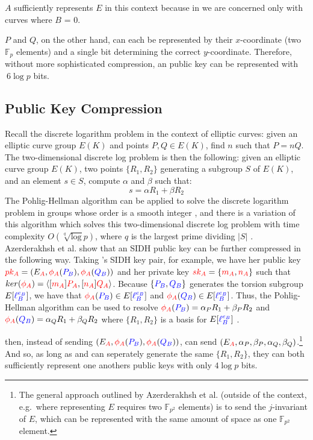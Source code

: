 $A$ sufficiently represents $E$ in this context because in \sidh we are concerned only with curves where $B$ = 0. 

$P$ and $Q$, on the other hand, can each be represented by their $x$-coordinate (two $\mathbb{F}_{p}$ elements) and a single bit determining the correct $y$-coordinate. Therefore, without more sophisticated compression, an \sidh public key can be represented with $~6\log p$ bits.

\subsection{Public Key Compression}

Recall the discrete logarithm problem in the context of elliptic curves: given an elliptic curve group $E(K)$ and points $P, Q \in E(K)$, find $n$ such that $P = nQ$. The two-dimensional discrete log problem is then the following: given an elliptic curve group $E(K)$, two points $\{R_1, R_2\}$ generating a subgroup $S$ of $E(K)$, and an element $s \in S$, compute $\alpha$ and $\beta$ such that:
$$
s = \alpha R_1 + \beta R_2
$$
The Pohlig-Hellman algorithm can be applied to solve the discrete logarithm problem in groups whose order is a smooth integer \cite{ph}, and there is a variation of this algorithm which solves this two-dimensional discrete log problem with time complexity $O(\sqrt[q]\log p)$, where $q$ is the largest prime dividing $\vert S\vert$ \cite{genph}.\\

\noindent
Azerderakhsh et al. show that an SIDH public key can be further compressed in the following way. Taking \alice's SIDH key pair, for example, we have her public key $\textcolor{red}{pk_A} = (E_{\textcolor{red}{A}}, \textcolor{red}{\phi_A}(\textcolor{blue}{P_B}),\textcolor{red}{\phi_A}(\textcolor{blue}{Q_B}))$ and her private key $\textcolor{red}{sk_A} = \{\textcolor{red}{m_A}, \textcolor{red}{n_A}\}$ such that $ker(\textcolor{red}{\phi_A}) = \langle [\textcolor{red}{m_A}]\textcolor{red}{P_A}, [\textcolor{red}{n_A}]\textcolor{red}{Q_A}\rangle$. Because $\{\textcolor{blue}{P_B}, \textcolor{blue}{Q_B}\}$ generates the torsion subgroup $E[\textcolor{blue}{\ell_{B}^{e_B}}]$, we have that $\textcolor{red}{\phi_A}(\textcolor{blue}{P_B}) \in E[\textcolor{blue}{\ell_{B}^{e_B}}]$ and $\textcolor{red}{\phi_A}(\textcolor{blue}{Q_B}) \in E[\textcolor{blue}{\ell_{B}^{e_B}}]$. Thus, the Pohlig-Hellman algorithm can be used to resolve $\textcolor{red}{\phi_A}(\textcolor{blue}{P_B}) = \alpha_P R_1 + \beta_P R_2$ and $\textcolor{red}{\phi_A}(\textcolor{blue}{Q_B}) = \alpha_Q R_1 + \beta_Q R_2$ where $\{R_1, R_2\}$ is a basis for $E[\textcolor{blue}{\ell_{B}^{e_B}}]$ \cite{compwr}.

\alice then, instead of sending \bob $(E_{\textcolor{red}{A}}, \textcolor{red}{\phi_A}(\textcolor{blue}{P_B}),\textcolor{red}{\phi_A}(\textcolor{blue}{Q_B}))$, can send $(E_{\textcolor{red}{A}}, \alpha_P, \beta_P, \alpha_Q, \beta_Q)$.\footnote{The general approach outlined by Azerderakhsh et al. (outside of the \sidh context, e.g.\ where representing $E$ requires two $\mathbb{F}_{p^2}$ elements) is to send the $j$-invariant of $E$, which can be represented with the same amount of space as one $\mathbb{F}_{p^2}$ element.} And so, as long as \alice and \bob can seperately generate the same $\{R_1, R_2\}$, they can both sufficiently represent one anothers public keys with only $4\log p$ bits.\\

